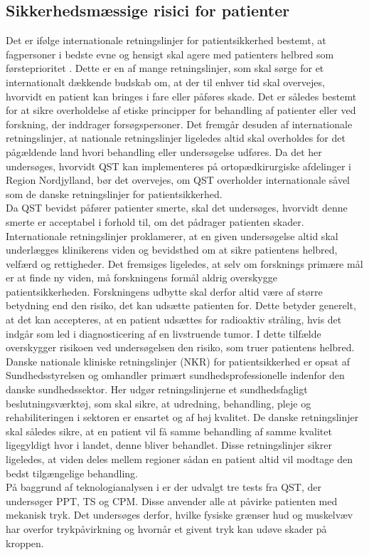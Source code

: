 \subsection{Sikkerhedsmæssige risici for patienter}
Det er ifølge internationale retningslinjer for patientsikkerhed bestemt, at fagpersoner i bedste evne og hensigt skal agere med patienters helbred som førsteprioritet \cite{helsinki2013}. Dette er en af mange retningslinjer, som skal sørge for et internationalt dækkende budskab om, at der til enhver tid skal overvejes, hvorvidt en patient kan bringes i fare eller påføres skade. Det er således bestemt for at sikre overholdelse af etiske principper for behandling af patienter eller ved forskning, der inddrager forsøgspersoner. Det fremgår desuden af internationale retningslinjer, at nationale retningslinjer ligeledes altid skal overholdes for det pågældende land hvori behandling eller undersøgelse udføres. Da det her undersøges, hvorvidt QST kan implementeres på ortopædkirurgiske afdelinger i Region Nordjylland, bør det overvejes, om QST overholder internationale såvel som de danske retningslinjer for patientsikkerhed. \cite{helsinki2013} \\
Da QST bevidst påfører patienter smerte, skal det undersøges, hvorvidt denne smerte er acceptabel i forhold til, om det pådrager patienten skader. Internationale retningslinjer proklamerer, at en given undersøgelse altid skal underlægges klinikerens viden og bevidsthed om at sikre patientens helbred, velfærd og rettigheder. Det fremsiges ligeledes, at selv om forsknings primære mål er at finde ny viden, må forskningens formål aldrig overskygge patientsikkerheden. Forskningens udbytte skal derfor altid være af større betydning end den risiko, det kan udsætte patienten for. \cite{helsinki2013} Dette betyder generelt, at det kan accepteres, at en patient udsættes for radioaktiv stråling, hvis det indgår som led i diagnosticering af en livstruende tumor. I dette tilfælde overskygger risikoen ved undersøgelsen den risiko, som truer patientens helbred. Danske nationale kliniske retningslinjer (NKR) for patientsikkerhed er opsat af Sundhedsstyrelsen og omhandler primært sundhedsprofessionelle indenfor den danske sundhedssektor. Her udgør retningslinjerne et sundhedsfagligt beslutningsværktøj, som skal sikre, at udredning, behandling, pleje og rehabiliteringen i sektoren er ensartet og af høj kvalitet. \cite{nkr2016, kommissorium2012} De danske retningslinjer skal således sikre, at en patient vil få samme behandling af samme kvalitet ligegyldigt hvor i landet, denne bliver behandlet. Disse retningslinjer sikrer ligeledes, at viden deles mellem regioner sådan en patient altid vil modtage den bedst tilgængelige behandling. \cite{nkr2016} \\
På baggrund af teknologianalysen i  er der udvalgt tre tests fra QST, der undersøger PPT, TS og CPM. Disse anvender alle at påvirke patienten med mekanisk tryk. Det undersøges derfor, hvilke fysiske grænser hud og muskelvæv har overfor trykpåvirkning og hvornår et givent tryk kan udøve skader på kroppen. \\

